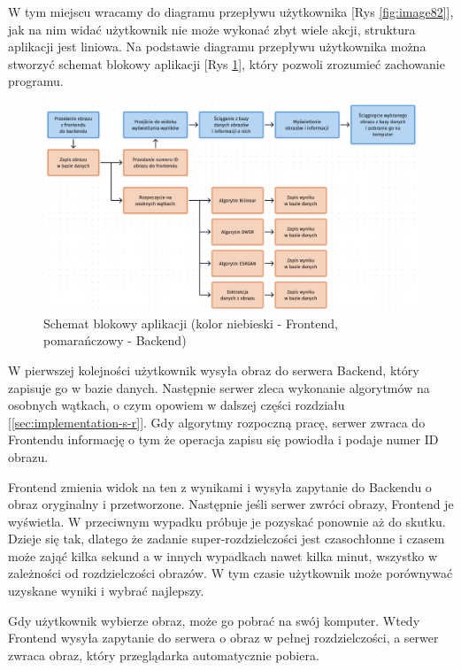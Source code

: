 W tym miejscu wracamy do diagramu przepływu użytkownika [Rys \ref{fig:image82}], jak na nim widać użytkownik nie może wykonać zbyt wiele akcji, struktura aplikacji jest liniowa. Na podstawie diagramu przepływu użytkownika można stworzyć schemat blokowy aplikacji [Rys \ref{fig:image87}], który pozwoli zrozumieć zachowanie programu.

\begin{figure}[H]
    \centering
    \includegraphics[width=\linewidth]{Rozdziały/06.Aplikacja/Obrazy/mechanizm_aplikacji.png}  
    \caption{Schemat blokowy aplikacji (kolor niebieski - Frontend, pomarańczowy - Backend)}
    \label{fig:image87}
\end{figure}

W pierwszej kolejności użytkownik wysyła obraz do serwera Backend, który zapisuje go w bazie danych. Następnie serwer zleca wykonanie algorytmów na osobnych wątkach, o czym opowiem w dalszej części rozdziału [\ref{sec:implementation-s-r}]. Gdy algorytmy rozpoczną pracę, serwer zwraca do Frontendu informację o tym że operacja zapisu się powiodła i podaje numer ID obrazu. 

Frontend zmienia widok na ten z wynikami i wysyła zapytanie do Backendu o obraz oryginalny i przetworzone. Następnie jeśli serwer zwróci obrazy, Frontend je wyświetla. W przeciwnym wypadku próbuje je pozyskać ponownie aż do skutku. Dzieje się tak, dlatego że zadanie super-rozdzielczości jest czasochłonne i czasem może zająć kilka sekund a w innych wypadkach nawet kilka minut, wszystko w zależności od rozdzielczości obrazów. W tym czasie użytkownik może porównywać uzyskane wyniki i wybrać najlepszy. 

Gdy użytkownik wybierze obraz, może go pobrać na swój komputer. Wtedy Frontend wysyła zapytanie do serwera o obraz w pełnej rozdzielczości, a serwer zwraca obraz, który przeglądarka automatycznie pobiera.

